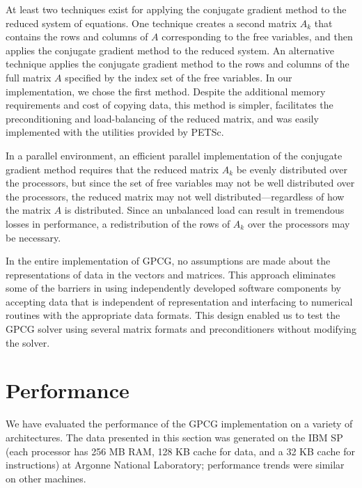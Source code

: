 \documentclass{esub2acm}
\begin{document}
At least two techniques exist for applying the conjugate gradient
method to the reduced system of equations.
One technique creates a second matrix $A_k$ that contains the
rows and columns of $A$ corresponding to the free variables,
and then applies the conjugate gradient method to the reduced system.
An alternative technique applies the conjugate gradient method
to the rows and columns of the full matrix $A$ specified by the
index set of the free variables.
In our implementation, we chose the first method.  Despite the
additional memory requirements and cost of copying data,
this method is simpler,
facilitates the preconditioning and load-balancing of the reduced matrix,
and was easily implemented with the utilities provided by PETSc.

In a parallel environment,
an efficient parallel implementation of the conjugate gradient method
requires that the reduced matrix $A_k$ 
be evenly distributed over the processors,
but since the set of free variables may not be well distributed over the
processors, the reduced matrix may not well distributed---regardless of
how the matrix $A$ is distributed.
Since an unbalanced load can result in tremendous losses in
performance, a redistribution of the rows of $A_k$ over the processors
may be necessary.

In the entire implementation of GPCG, no assumptions are made about
the representations of data in the vectors and matrices.  This
approach eliminates some of the barriers in using independently
developed software components by accepting data that is independent of
representation and interfacing to numerical routines with the appropriate
data formats.  This design enabled us to test the GPCG solver
using several matrix formats and preconditioners without modifying the
solver.





\section{Performance}

\label{sec:performance}

We have evaluated the performance of the GPCG implementation
on a variety of architectures.
The data presented in this section 
was generated on the IBM SP
(each processor has 256 MB RAM, 128 KB cache
for data, and a 32 KB cache for instructions)
at Argonne National Laboratory; performance trends
were similar on other machines.
\end{document}
